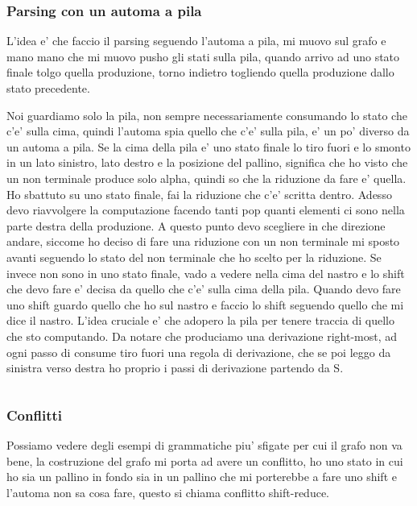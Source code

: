 
\subsubsection{Parsing con un automa a pila}
L'idea e' che faccio il parsing seguendo l'automa a pila, mi muovo sul grafo e mano mano che mi muovo pusho gli stati sulla pila, quando arrivo ad uno stato finale tolgo quella produzione, torno indietro togliendo quella produzione dallo stato precedente.

Noi guardiamo solo la pila, non sempre necessariamente consumando lo stato che c'e' sulla cima, quindi l'automa spia quello che c'e' sulla pila, e' un po' diverso da un automa a pila.
Se la cima della pila e' uno stato finale lo tiro fuori e lo smonto in un lato sinistro, lato destro e la posizione del pallino, significa che ho visto che un non terminale produce solo alpha, quindi so che la riduzione da fare e' quella. Ho sbattuto su uno stato finale, fai la riduzione che c'e' scritta dentro. Adesso devo riavvolgere la computazione facendo tanti pop quanti elementi ci sono nella parte destra della produzione. A questo punto devo scegliere in che direzione andare, siccome ho deciso di fare una riduzione con un non terminale mi sposto avanti seguendo lo stato del non terminale che ho scelto per la riduzione.
Se invece non sono in uno stato finale, vado a vedere nella cima del nastro e lo shift che devo fare e' decisa da quello che c'e' sulla cima della pila. Quando devo fare uno shift guardo quello che ho sul nastro e faccio lo shift seguendo quello che mi dice il nastro.
L'idea cruciale e' che adopero la pila per tenere traccia di quello che sto computando.
Da notare che produciamo una derivazione right-most, ad ogni passo di consume tiro fuori una regola di derivazione, che se poi leggo da sinistra verso destra ho proprio i passi di derivazione partendo da S.

\begin{lstlisting}

\end{lstlisting}

\subsubsection{Conflitti}
Possiamo vedere degli esempi di grammatiche piu' sfigate per cui il grafo non va bene, la costruzione del grafo mi porta ad avere un conflitto, ho uno stato in cui ho sia un pallino in fondo sia in un pallino che mi porterebbe a fare uno shift e l'automa non sa cosa fare, questo si chiama conflitto shift-reduce.

